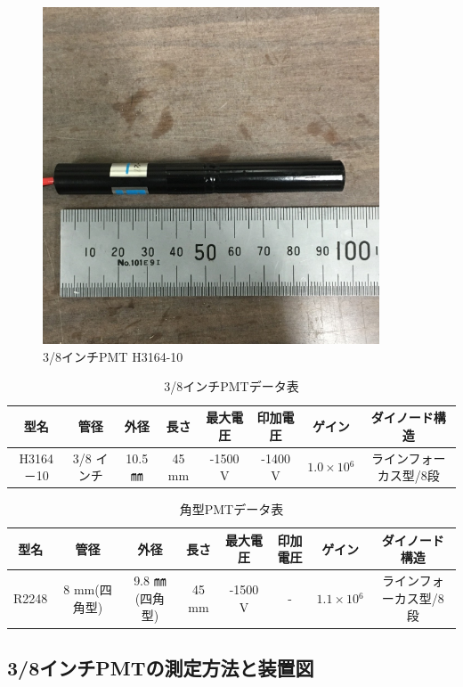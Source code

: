 \begin{figure}[H]
	\centering
		\includegraphics[width=10cm]{fig/iguchi/miniPMT.jpg}
	\caption{3/8インチPMT H3164-10}
	\label{3/8inch}
\end{figure}

\begin{table}[h]
	\centering
	
	  \begin{tabular}{cccccccc} \hline
		型名& 管径 & 外径 & 長さ & 最大電圧 & 印加電圧 & ゲイン & ダイノード構造 \\ \hline \hline
		H3164－10 & 3/8 インチ & 10.5 ㎜ & 45 mm & -1500 V & -1400 V & $1.0\times10{^{6}}$ &ラインフォーカス型/8段　\\ \hline
	\end{tabular}
	  \caption{3/8インチPMTデータ表}
	  \label{3/8inchPMT}
\end{table}

\begin{table}[h]
	\centering
	  \begin{tabular}{cccccccc} \hline
		型名& 管径 & 外径 & 長さ & 最大電圧 & 印加電圧 & ゲイン & ダイノード構造 \\ \hline \hline
		R2248 & 8 mm(四角型) & 9.8 ㎜(四角型)& 45 mm & -1500 V & - & $1.1\times10{^{6}}$ &ラインフォーカス型/8段 \\ \hline
	\end{tabular}
	  \caption{角型PMTデータ表}
\end{table}


\subsection{3/8インチPMTの測定方法と装置図}

